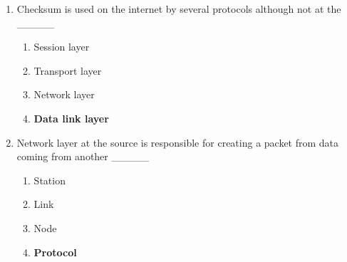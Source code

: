 \documentclass{article}
\begin{document}
\begin{enumerate}[label=\arabic*.]
    \item Checksum is used on the internet by several protocols although not at the \_\_\_\_\_
    \begin{enumerate}
        \item Session layer
        \item Transport layer
        \item Network layer
        \item \textbf{Data link layer}
    \end{enumerate}

    \item Network layer at the source is responsible for creating a packet from data coming from another \_\_\_\_\_
    \begin{enumerate}
        \item Station
        \item Link
        \item Node
        \item \textbf{Protocol}
    \end{enumerate}

\end{enumerate}
\end{document}
